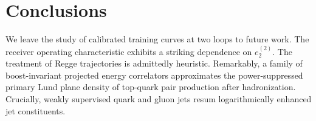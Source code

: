 \section{Conclusions}\label{sec:conclusions}

We leave the study of calibrated training curves at two loops to future
work. The receiver operating characteristic exhibits a striking
dependence on $e_2^{(2)}$. The treatment of Regge trajectories is
admittedly heuristic. Remarkably, a family of boost-invariant projected
energy correlators approximates the power-suppressed primary Lund plane
density of top-quark pair production after hadronization. Crucially,
weakly supervised quark and gluon jets resum logarithmically enhanced
jet constituents.

